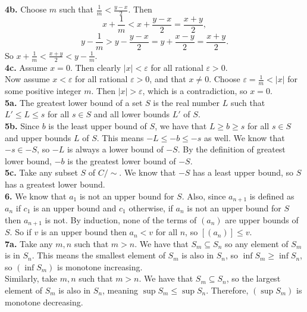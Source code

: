 \documentclass{article}
\newcommand{\eps}{\varepsilon}
\begin{document}
\textbf{4b.} Choose $m$ such that $\frac{1}{m} < \frac{y - x}{2}$. Then
$$x + \frac{1}{m} < x + \frac{y - x}{2} = \frac{x + y}{2},$$
$$y - \frac{1}{m} > y - \frac{y - x}{2} = y + \frac{x - y}{2} = \frac{x + y}{2}.$$
So $x + \frac{1}{m} < \frac{x + y}{2} < y - \frac{1}{m}$. \\

\textbf{4c.} Assume $x = 0$. Then clearly $|x| < \eps$ for all rational $\eps > 0$. \\

Now assume $x < \eps$ for all rational $\eps > 0$, and that $x \neq 0$. Choose $\eps = \frac{1}{m} < |x|$ for some positive integer $m$. Then $|x| > \eps$, which is a contradiction, so $x = 0$. \\

\textbf{5a.} The greatest lower bound of a set $S$ is the real number $L$ such that $L' \le L \le s$ for all $s \in S$ and all lower bounds $L'$ of $S$. \\

\textbf{5b.} Since $b$ is the least upper bound of $S$, we have that $L \ge b \ge s$ for all $s \in S$ and upper bounds $L$ of $S$. This means $-L \le -b \le -s$ as well. We know that $-s \in -S$, so $-L$ is always a lower bound of $-S$. By the definition of greatest lower bound, $-b$ is the greatest lower bound of $-S$. \\

\textbf{5c.} Take any subset $S$ of $C/\sim$. We know that $-S$ has a least upper bound, so $S$ has a greatest lower bound. \\

\textbf{6.} We know that $a_1$ is not an upper bound for $S$. Also, since $a_{n + 1}$ is defined as $a_n$ if $c_1$ is an upper bound and $c_1$ otherwise, if $a_n$ is not an upper bound for $S$ then $a_{n + 1}$ is not. By induction, none of the terms of $(a_n)$ are upper bounds of $S$. So if $v$ is an upper bound then $a_n < v$ for all $n$, so $[(a_n)] \le v$. \\

\textbf{7a.} Take any $m, n$ such that $m > n$. We have that $S_m \subseteq S_n$ so any element of $S_m$ is in $S_n$. This means the smallest element of $S_m$ is also in $S_n$, so $\inf S_m \ge \inf S_n$, so $(\inf S_m)$ is monotone increasing. \\

Similarly, take $m, n$ such that $m > n$. We have that $S_m \subseteq S_n$, so the largest element of $S_m$ is also in $S_n$, meaning $\sup S_m \le \sup S_n$. Therefore, $(\sup S_m)$ is monotone decreasing. \\
\end{document}

